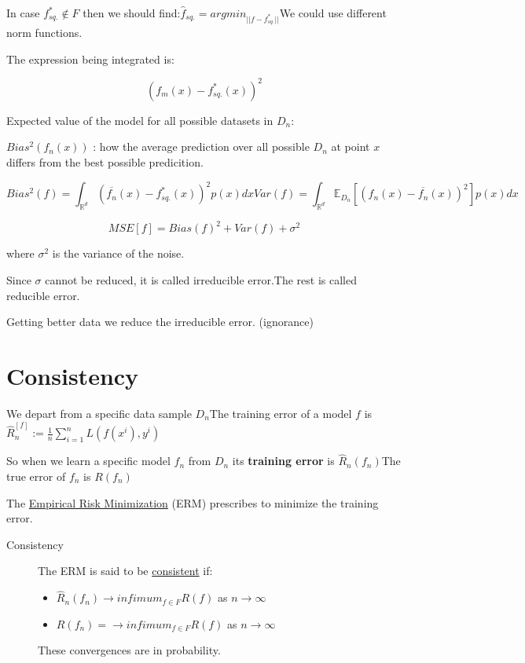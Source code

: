 In case \(f^*_{sq.} \notin F\) then we should
find:\(\hat{f}_{sq.} = argmin_{|| f - f^*_{sq.} ||}\)We could use
different norm functions.

The expression being integrated is:

\[\left( f_m(x) - f^*_{sq.}(x) \right)^2
\]

Expected value of the model for all possible datasets in \(D_n\):

\(Bias^2(f_n(x))\) : how the average prediction over all possible
\(D_n\) at point \(x\)differs from the best possible predicition.

\[Bias^2(f) = \int_{\mathds{R}^d} \left( \overline{f_n}(x) - f_{sq.}^*(x) \right)^2 p(x) dx
	Var(f) = \int_{\mathds{R}^d} \mathds{E}_{D_n} \left[ \left( f_n(x) - \overline{f_n}(x) \right)^2 \right] p(x) dx
\]

\[MSE[f] = Bias(f)^2 + Var(f) + \sigma^2
\]

where \(\sigma^2\) is the variance of the noise.

Since \(\sigma\) cannot be reduced, it is called irreducible error.The
rest is called reducible error.

Getting better data we reduce the irreducible error. (ignorance)

\section{Consistency}

We depart from a specific data sample \(D_n\)The training error of a
model \(f\) is
\(\hat{R}_n^{[f]} := \frac{1}{n} \sum_{i=1}^n L(f(x^i), y^i)\)

So when we learn a specific model \(f_n\) from \(D_n\) its
\textbf{training error} is \(\hat{R}_n(f_n)\)The true error of \(f_n\)
is \(R(f_n)\)

The \uline{Empirical Risk Minimization} (ERM) prescribes to minimize the
training error.

\begin{description}
	\item[Consistency]
		The ERM is said to be \uline{consistent} if:

		\begin{itemize}
			\item
			      \(\hat{R}_n(f_n) \rightarrow {infimum}_{f \in F} R(f)\) as
			      \(n \rightarrow \infty\)
			\item
			      \(R(f_n) = \rightarrow {infimum}_{f \in F} R(f)\) as
			      \(n \rightarrow \infty\)
		\end{itemize}

		These convergences are in probability.
\end{description}

